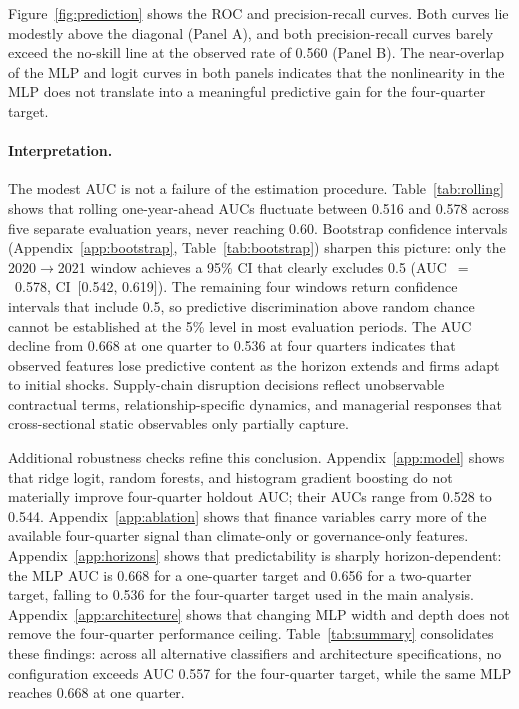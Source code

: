 \documentclass[12pt]{article}
\begin{document}
Figure~\ref{fig:prediction} shows the ROC and precision-recall curves.
Both curves lie modestly above the diagonal (Panel A), and both
precision-recall curves barely exceed the no-skill line at the observed
rate of 0.560 (Panel B).  The near-overlap of the MLP and logit curves in
both panels indicates that the nonlinearity in the MLP does not translate
into a meaningful predictive gain for the four-quarter target.

\paragraph{Interpretation.}
The modest AUC is not a failure of the estimation procedure.
Table~\ref{tab:rolling} shows that rolling one-year-ahead AUCs fluctuate
between 0.516 and 0.578 across five separate evaluation years, never
reaching 0.60.  Bootstrap confidence intervals (Appendix~\ref{app:bootstrap},
Table~\ref{tab:bootstrap}) sharpen this picture: only the
2020$\to$2021 window achieves a 95\% CI that clearly excludes 0.5
(AUC~$=$~0.578, CI~$[$0.542, 0.619$]$).  The remaining four windows return
confidence intervals that include 0.5, so predictive discrimination above
random chance cannot be established at the 5\% level in most evaluation
periods.  The AUC decline from 0.668 at one quarter to 0.536 at four quarters
indicates that observed features lose predictive content as the horizon
extends and firms adapt to initial shocks.  Supply-chain disruption
decisions reflect unobservable contractual terms, relationship-specific
dynamics, and managerial responses that cross-sectional static observables
only partially capture.

Additional robustness checks refine this conclusion.  Appendix~\ref{app:model}
shows that ridge logit, random forests, and histogram gradient boosting do not
materially improve four-quarter holdout AUC; their AUCs range from 0.528 to
0.544.  Appendix~\ref{app:ablation} shows that finance variables carry more of
the available four-quarter signal than climate-only or governance-only
features.  Appendix~\ref{app:horizons} shows that predictability is sharply
horizon-dependent: the MLP AUC is 0.668 for a one-quarter target and 0.656 for
a two-quarter target, falling to 0.536 for the four-quarter target used in the
main analysis.  Appendix~\ref{app:architecture} shows that changing MLP width
and depth does not remove the four-quarter performance ceiling.
Table~\ref{tab:summary} consolidates these findings: across all alternative
classifiers and architecture specifications, no configuration exceeds AUC 0.557
for the four-quarter target, while the same MLP reaches 0.668 at one quarter.
\end{document}
